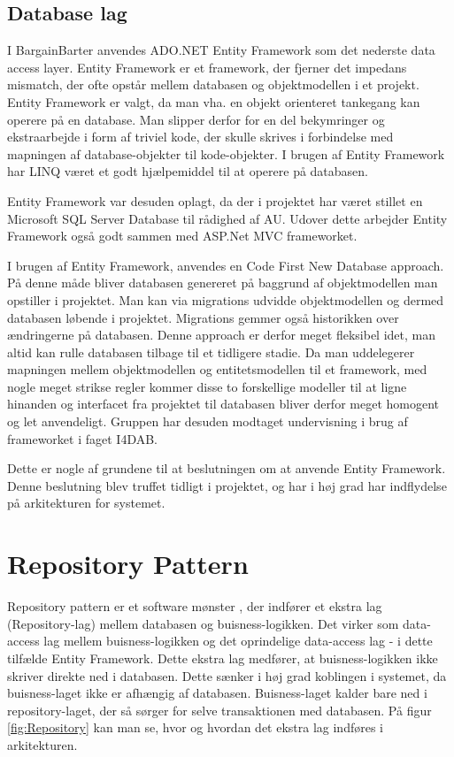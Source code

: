 \subsection{Database lag}
I BargainBarter anvendes ADO.NET Entity Framework\cite{ADOEF} som det nederste data access layer. Entity Framework er et framework, der fjerner det impedans mismatch, der ofte opstår mellem databasen og objektmodellen i et projekt. Entity Framework er valgt, da man vha. en objekt orienteret tankegang kan operere på en database. Man slipper derfor for en del bekymringer og ekstraarbejde i form af triviel kode, der skulle skrives i forbindelse med mapningen af database-objekter til kode-objekter. I brugen af Entity Framework har LINQ \cite{LINQ} været et godt hjælpemiddel til at operere på databasen. 

Entity Framework var desuden oplagt, da der i projektet har været stillet en Microsoft SQL Server Database til rådighed af AU. Udover dette arbejder Entity Framework også godt sammen med ASP.Net MVC frameworket.  

I brugen af Entity Framework, anvendes en Code First New Database\cite{EFCodeFirst} approach. På denne måde bliver databasen genereret på baggrund af objektmodellen man opstiller i projektet. Man kan via migrations udvidde objektmodellen og dermed databasen løbende i projektet. Migrations gemmer også historikken over ændringerne på databasen. Denne approach er derfor meget fleksibel idet, man altid kan rulle databasen tilbage til et tidligere stadie. Da man uddelegerer mapningen mellem objektmodellen og entitetsmodellen til et framework, med nogle meget strikse regler kommer disse to forskellige modeller til at ligne hinanden og interfacet fra projektet til databasen bliver derfor meget homogent og let anvendeligt. Gruppen har desuden modtaget undervisning i brug af frameworket i faget I4DAB.

Dette er nogle af grundene til at beslutningen om at anvende Entity Framework. Denne beslutning blev truffet tidligt i projektet, og har i høj grad har indflydelse på arkitekturen for systemet.

\section{Repository Pattern}
Repository pattern er et software mønster \cite{pattern}, der indfører et ekstra lag (Repository-lag) mellem databasen og buisness-logikken. Det virker som data-access lag mellem buisness-logikken og det oprindelige data-access lag - i dette tilfælde Entity Framework. Dette ekstra lag medfører, at buisness-logikken ikke skriver direkte ned i databasen. Dette sænker i høj grad koblingen i systemet, da buisness-laget ikke er afhængig af databasen. 
Buisness-laget kalder bare ned i repository-laget, der så sørger for selve transaktionen med databasen. 
På figur \ref{fig:Repository} kan man se, hvor og hvordan det ekstra lag indføres i arkitekturen.

